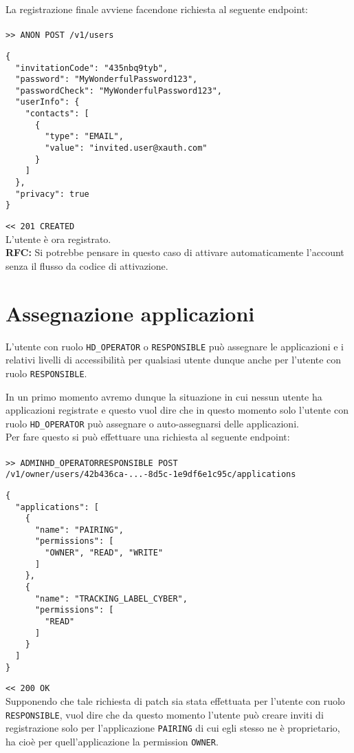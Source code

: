 \documentclass[a4paper,12pt]{article}
\begin{document}
La registrazione finale avviene facendone richiesta al seguente endpoint:\\
\\
\texttt{>> ANON POST /v1/users}
\begin{lstlisting}
{
  "invitationCode": "435nbq9tyb",
  "password": "MyWonderfulPassword123",
  "passwordCheck": "MyWonderfulPassword123",
  "userInfo": {
    "contacts": [
      {
        "type": "EMAIL",
        "value": "invited.user@xauth.com"
      }
    ]
  },
  "privacy": true
}
\end{lstlisting}
\texttt{<< 201 CREATED}\\

L’utente è ora registrato.\\

\textbf{RFC:} Si potrebbe pensare in questo caso di attivare automaticamente l’account senza il flusso da codice di attivazione.

\section{Assegnazione applicazioni}
L’utente con ruolo \texttt{HD\_OPERATOR} o \texttt{RESPONSIBLE} può assegnare le applicazioni e i relativi livelli di accessibilità per qualsiasi utente dunque anche per l’utente con ruolo \texttt{RESPONSIBLE}.

In un primo momento avremo dunque la situazione in cui nessun utente ha applicazioni registrate e questo vuol dire che in questo momento solo l’utente con ruolo \texttt{HD\_OPERATOR} può assegnare o auto-assegnarsi delle applicazioni.\\

Per fare questo si può effettuare una richiesta al seguente endpoint:\\
\\
\texttt{>> ADMIN\textbar HD\_OPERATOR\textbar RESPONSIBLE POST\\
/v1/owner/users/42b436ca-...-8d5c-1e9df6e1c95c/applications}
\begin{lstlisting}
{
  "applications": [
    {
      "name": "PAIRING",
      "permissions": [
        "OWNER", "READ", "WRITE"
      ]
    },
    {
      "name": "TRACKING_LABEL_CYBER",
      "permissions": [
        "READ"
      ]
    }
  ]
}
\end{lstlisting}
\texttt{<< 200 OK}\\

Supponendo che tale richiesta di patch sia stata effettuata per l’utente con ruolo \texttt{RESPONSIBLE}, vuol dire che da questo momento l’utente può creare inviti di registrazione solo per l’applicazione \texttt{PAIRING} di cui egli stesso ne è proprietario, ha cioè per quell’applicazione la permission \texttt{OWNER}.
\end{document}
